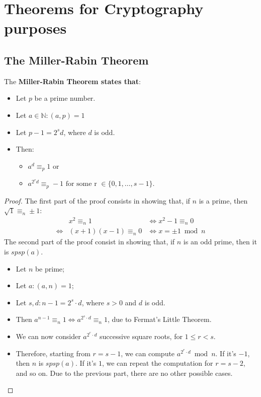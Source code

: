 \section{Theorems for Cryptography purposes}
\subsection{The Miller-Rabin Theorem}
\begin{theorem}
    The \textbf{Miller-Rabin Theorem states that}:
    \begin{itemize}
        \item Let $p$ be a prime number.
        \item Let $a \in \mathbb{N}: (a, p) = 1$
        \item Let $p - 1 = 2^{s}d$, where $d$ is odd.
        \item Then:
        \begin{itemize}
            \item $a^{d} \equiv_{p} 1$ or
            \item $a^{2^{r}d} \equiv_{p} -1 \text{ for some r } \in \{0, 1, \dots, s-1\}$.
        \end{itemize}
    \end{itemize}
\end{theorem}
\begin{proof}
    The first part of the proof consists in showing that, if $n$ is a prime, then $\sqrt{1} \equiv_{n} \pm 1$:
    \begin{align*}
        &x^{2} \equiv_{n} 1 &\iff x^{2} - 1 \equiv_{n} 0\\
        \iff& (x + 1)(x - 1) \equiv_{n} 0 &\iff x = \pm 1 \bmod n
    \end{align*}
    The second part of the proof consist in showing  that, if $n$ is an odd prime, then it is $spsp(a)$.
    \begin{itemize}
        \item Let $n$ be prime;
        \item Let $a: (a,n) = 1$;
        \item Let $s,d: n - 1 = 2^s \cdot d$, where $s > 0$ and $d$ is odd.
        \item Then $a^{n-1} \equiv_{n} 1 \iff a^{2^s \cdot d} \equiv_{n} 1$, due to Fermat's Little Theorem.
        \item We can now consider $a^{2^r \cdot d}$ successive square roots, for $1 \leq r < s$.
        \item Therefore, starting from $r = s - 1$, we can compute $a^{2^r \cdot d} \bmod n$. If it's $-1$, then $n$ is $spsp(a)$. If it's $1$, we can repeat the computation for $r = s - 2$, and so on. Due to the previous part, there are no other possible cases.
    \end{itemize}
\end{proof}

